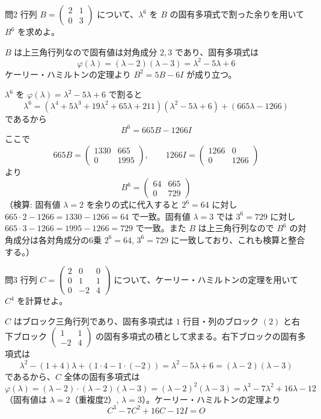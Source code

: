 \documentclass[a4paper,11pt]{article}
\begin{document}
\clearpage
\begin{mondaiboxS}{問2}
行列 $B = \begin{pmatrix} 2 & 1 \\ 0 & 3 \end{pmatrix}$ について、$\lambda^{6}$ を $B$ の固有多項式で割った余りを用いて $B^{6}$ を求めよ。
\end{mondaiboxS}
\kaitou
$B$ は上三角行列なので固有値は対角成分 $2, 3$ であり、固有多項式は
\[
\varphi(\lambda) = (\lambda - 2)(\lambda - 3) = \lambda^{2} - 5\lambda + 6
\]
ケーリー・ハミルトンの定理より $B^{2} = 5B - 6I$ が成り立つ。

$\lambda^{6}$ を $\varphi(\lambda) = \lambda^{2} - 5\lambda + 6$ で割ると
\[
\lambda^{6} = (\lambda^{4} + 5\lambda^{3} + 19\lambda^{2} + 65\lambda + 211)(\lambda^{2} - 5\lambda + 6) + (665\lambda - 1266)
\]
であるから
\[
B^{6} = 665B - 1266I
\]
ここで
\[
665B = \begin{pmatrix} 1330 & 665 \\ 0 & 1995 \end{pmatrix}, \qquad 1266I = \begin{pmatrix} 1266 & 0 \\ 0 & 1266 \end{pmatrix}
\]
より
\[
\boxed{\; B^{6} = \begin{pmatrix} 64 & 665 \\ 0 & 729 \end{pmatrix} \;}
\]
（検算: 固有値 $\lambda=2$ を余りの式に代入すると $2^{6} = 64$ に対し $665\cdot2 - 1266 = 1330-1266=64$ で一致。固有値 $\lambda=3$ では $3^{6}=729$ に対し $665\cdot3-1266=1995-1266=729$ で一致。また $B$ は上三角行列なので $B^{6}$ の対角成分は各対角成分の6乗 $2^{6}=64$, $3^{6}=729$ に一致しており、これも検算と整合する。）

\clearpage
\begin{mondaiboxS}{問3}
行列 $C = \begin{pmatrix} 2 & 0 & 0 \\ 0 & 1 & 1 \\ 0 & -2 & 4 \end{pmatrix}$ について、ケーリー・ハミルトンの定理を用いて $C^{4}$ を計算せよ。
\end{mondaiboxS}
\kaitou
$C$ はブロック三角行列であり、固有多項式は $1$ 行目・列のブロック $(2)$ と右下ブロック $\begin{pmatrix}1&1\\-2&4\end{pmatrix}$ の固有多項式の積として求まる。右下ブロックの固有多項式は
\[
\lambda^{2} - (1+4)\lambda + (1\cdot4 - 1\cdot(-2)) = \lambda^{2} - 5\lambda + 6 = (\lambda-2)(\lambda-3)
\]
であるから、$C$ 全体の固有多項式は
\[
\varphi(\lambda) = (\lambda - 2)\cdot(\lambda-2)(\lambda-3) = (\lambda-2)^{2}(\lambda-3) = \lambda^{3} - 7\lambda^{2} + 16\lambda - 12
\]
（固有値は $\lambda = 2$（重複度2）, $\lambda = 3$）。ケーリー・ハミルトンの定理より
\[
C^{3} - 7C^{2} + 16C - 12I = O
\]
\end{document}
